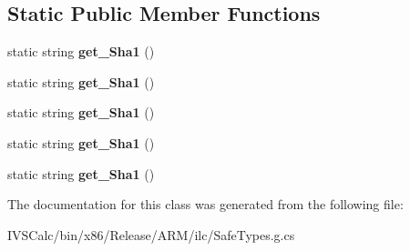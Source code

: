 \subsection*{Static Public Member Functions}
\begin{DoxyCompactItemize}
\item 
\mbox{\label{class_windows_1_1_security_1_1_cryptography_1_1_core_1_1_hash_algorithm_names_a7beb26c0d93601a03fa337c82aa41996}} 
static string {\bfseries get\+\_\+\+Sha1} ()
\item 
\mbox{\label{class_windows_1_1_security_1_1_cryptography_1_1_core_1_1_hash_algorithm_names_a7beb26c0d93601a03fa337c82aa41996}} 
static string {\bfseries get\+\_\+\+Sha1} ()
\item 
\mbox{\label{class_windows_1_1_security_1_1_cryptography_1_1_core_1_1_hash_algorithm_names_a7beb26c0d93601a03fa337c82aa41996}} 
static string {\bfseries get\+\_\+\+Sha1} ()
\item 
\mbox{\label{class_windows_1_1_security_1_1_cryptography_1_1_core_1_1_hash_algorithm_names_a7beb26c0d93601a03fa337c82aa41996}} 
static string {\bfseries get\+\_\+\+Sha1} ()
\item 
\mbox{\label{class_windows_1_1_security_1_1_cryptography_1_1_core_1_1_hash_algorithm_names_a7beb26c0d93601a03fa337c82aa41996}} 
static string {\bfseries get\+\_\+\+Sha1} ()
\end{DoxyCompactItemize}


The documentation for this class was generated from the following file\+:\begin{DoxyCompactItemize}
\item 
I\+V\+S\+Calc/bin/x86/\+Release/\+A\+R\+M/ilc/Safe\+Types.\+g.\+cs\end{DoxyCompactItemize}
